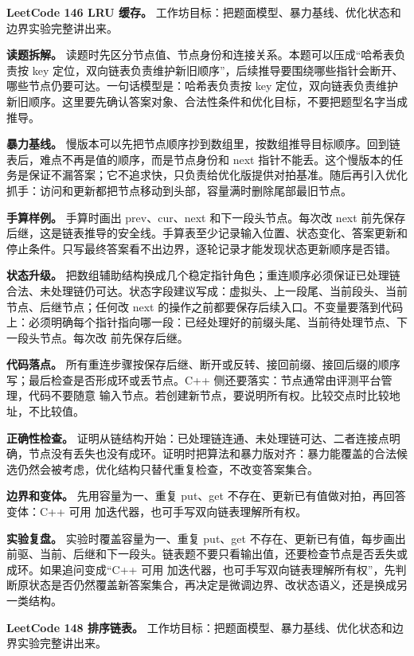 \noindent\textbf{LeetCode 146 LRU 缓存。} 工作坊目标：把题面模型、暴力基线、优化状态和边界实验完整讲出来。

\textbf{读题拆解。} 读题时先区分节点值、节点身份和连接关系。本题可以压成“哈希表负责按 key 定位，双向链表负责维护新旧顺序”，后续推导要围绕哪些指针会断开、哪些节点仍要可达。一句话模型是：哈希表负责按 key 定位，双向链表负责维护新旧顺序。这里要先确认答案对象、合法性条件和优化目标，不要把题型名字当成推导。

\textbf{暴力基线。} 慢版本可以先把节点顺序抄到数组里，按数组推导目标顺序。回到链表后，难点不再是值的顺序，而是节点身份和 next 指针不能丢。这个慢版本的任务是保证不漏答案；它不追求快，只负责给优化版提供对拍基准。随后再引入优化抓手：访问和更新都把节点移动到头部，容量满时删除尾部最旧节点。

\textbf{手算样例。} 手算时画出 prev、cur、next 和下一段头节点。每次改 next 前先保存后继，这是链表推导的安全线。手算表至少记录输入位置、状态变化、答案更新和停止条件。只写最终答案看不出边界，逐轮记录才能发现状态更新顺序是否错。

\textbf{状态升级。} 把数组辅助结构换成几个稳定指针角色；重连顺序必须保证已处理链合法、未处理链仍可达。状态字段建议写成：虚拟头、上一段尾、当前段头、当前节点、后继节点；任何改 next 的操作之前都要保存后续入口。不变量要落到代码上：必须明确每个指针指向哪一段：已经处理好的前缀头尾、当前待处理节点、下一段头节点。每次改  前先保存后继。

\textbf{代码落点。} 所有重连步骤按保存后继、断开或反转、接回前缀、接回后缀的顺序写；最后检查是否形成环或丢节点。C++ 侧还要落实：节点通常由评测平台管理，代码不要随意  输入节点。若创建新节点，要说明所有权。比较交点时比较地址，不比较值。

\textbf{正确性检查。} 证明从链结构开始：已处理链连通、未处理链可达、二者连接点明确，节点没有丢失也没有成环。证明时把算法和暴力版对齐：暴力能覆盖的合法候选仍然会被考虑，优化结构只替代重复检查，不改变答案集合。

\textbf{边界和变体。} 先用容量为一、重复 put、get 不存在、更新已有值做对拍，再回答变体：C++ 可用  加迭代器，也可手写双向链表理解所有权。

\textbf{实验复盘。} 实验时覆盖容量为一、重复 put、get 不存在、更新已有值，每步画出前驱、当前、后继和下一段头。链表题不要只看输出值，还要检查节点是否丢失或成环。如果追问变成“C++ 可用  加迭代器，也可手写双向链表理解所有权”，先判断原状态是否仍然覆盖新答案集合，再决定是微调边界、改状态语义，还是换成另一类结构。

\noindent\textbf{LeetCode 148 排序链表。} 工作坊目标：把题面模型、暴力基线、优化状态和边界实验完整讲出来。

